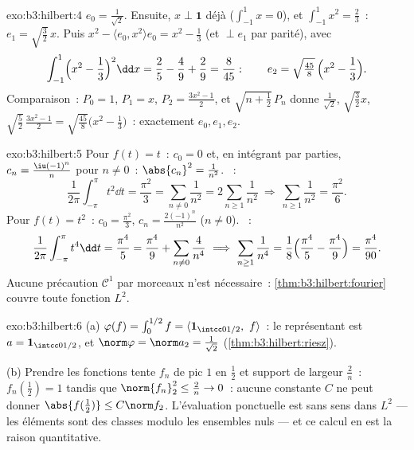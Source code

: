 \begin{solution}{exo:b3:hilbert:4}
$e_0 = \frac1{\sqrt2}$. Ensuite, $x \perp \mathbf 1$ déjà
($\int_{-1}^1x = 0$), et $\int_{-1}^1x^2 = \frac23$~: $e_1 =
\sqrt{\tfrac32}\,x$. Puis $x^2 - \langle e_0, x^2\rangle e_0 =
x^2 - \frac13$ (et $\perp e_1$ par parité), avec
\[
\int_{-1}^1\Bigl(x^2 - \frac13\Bigr)^2\dd x = \frac25 -
\frac49 + \frac29 = \frac{8}{45}:
\qquad e_2 = \sqrt{\tfrac{45}8}\,\Bigl(x^2 - \frac13\Bigr).
\]
Comparaison~: $P_0 = 1$, $P_1 = x$, $P_2 = \frac{3x^2 - 1}2$, et
$\sqrt{n + \tfrac12}\,P_n$ donne $\frac1{\sqrt2}$,
$\sqrt{\frac32}x$, $\sqrt{\frac52}\,\frac{3x^2-1}2 =
\sqrt{\frac{45}8}\bigl(x^2 - \frac13\bigr)$~: exactement $e_0,
e_1, e_2$.
\end{solution}

\begin{solution}{exo:b3:hilbert:5}
Pour $f(t) = t$~: $c_0 = 0$ et, en intégrant par parties, $c_n =
\frac{\iu(-1)^n}{n}$ pour $n \neq 0$~: $\abs{c_n}^2 =
\frac1{n^2}$. ~:
\[
\frac1{2\pi}\int_{-\pi}^\pi t^2\dd t = \frac{\pi^2}3
= \sum_{n\neq0}\frac1{n^2} = 2\sum_{n\geq1}\frac1{n^2}
\ \Longrightarrow\ \sum_{n\geq1}\frac1{n^2} = \frac{\pi^2}6 .
\]
Pour $f(t) = t^2$~: $c_0 = \frac{\pi^2}3$, $c_n =
\frac{2(-1)^n}{n^2}$ ($n \ne 0$). ~:
\[
\frac1{2\pi}\int_{-\pi}^{\pi}t^4\dd t = \frac{\pi^4}5
= \frac{\pi^4}9 + \sum_{n\neq0}\frac4{n^4}
\ \Longrightarrow\
\sum_{n\geq1}\frac1{n^4} = \frac18\Bigl(\frac{\pi^4}5 -
\frac{\pi^4}9\Bigr) = \frac{\pi^4}{90} .
\]
Aucune précaution $\mathcal C^1$ par morceaux n'est nécessaire~:
\cref{thm:b3:hilbert:fourier} couvre toute fonction $L^2$.
\end{solution}

\begin{solution}{exo:b3:hilbert:6}
(a) $\varphi(f) = \int_0^{1/2}f = \langle\mathbf
1_{\intcc0{1/2}},\ f\rangle$~: le représentant est $a =
\mathbf 1_{\intcc0{1/2}}$, et $\norm\varphi = \norm a_2 =
\frac1{\sqrt2}$ (\cref{thm:b3:hilbert:riesz}).

(b) Prendre les fonctions tente $f_n$ de pic $1$ en
$\frac12$ et support de largeur $\frac2n$~: $f_n(\tfrac12) = 1$
tandis que $\norm{f_n}_2^2 \leq \frac2n \to 0$~: aucune
constante $C$ ne peut donner $\abs{f(\frac12)} \leq C\norm
f_2$. L'évaluation ponctuelle est sans sens dans $L^2$ ---
les éléments sont des classes modulo les ensembles nuls ---
et ce calcul en est la raison quantitative.
\end{solution}

